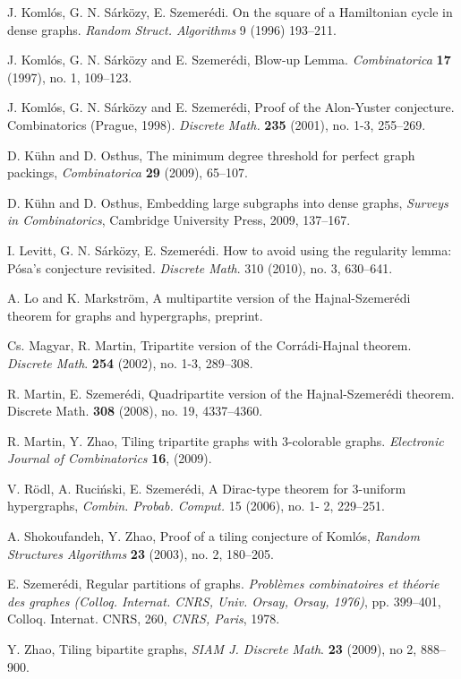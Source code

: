 \documentclass[reqno]{amsart}
\theoremstyle{plain}
\begin{document}
\begin{thebibliography}{99}
J. Koml\'os, G. N. S\'ark\"ozy, E. Szemer\'edi. On the square of a Hamiltonian
cycle in dense graphs. {\em Random Struct. Algorithms} 9 (1996) 193--211.

 J. Koml\'os, G. N. S\'ark\"ozy and E.
Szemer\'edi, Blow-up Lemma. {\em Combinatorica} {\bf 17} (1997),
no. 1, 109--123.

J. Koml\'os, G. N. S\'ark\"ozy and E. Szemer\'edi, Proof of the
Alon-Yuster conjecture. Combinatorics (Prague, 1998). {\em
Discrete Math.} {\bf 235} (2001), no. 1-3, 255--269.

D. K\"{u}hn and D. Osthus, The minimum degree threshold for perfect
graph packings, {\em Combinatorica} \textbf{29} (2009), 65--107.

D. K\"{u}hn and D. Osthus, Embedding large subgraphs into dense
graphs, {\em Surveys in Combinatorics}, Cambridge University Press, 2009, 137--167.

I. Levitt, G. N. S\'ark\"ozy, E. Szemer\'edi. How to avoid using the regularity
lemma: P\'osa's conjecture revisited. {\em Discrete Math}. 310 (2010), no. 3,
630--641.

A. Lo and K. Markstr\"{o}m, A multipartite version of the Hajnal-Szemer\'edi theorem for graphs and hypergraphs, preprint.

 Cs. Magyar, R. Martin, Tripartite version of the
Corr\'adi-Hajnal theorem. {\em Discrete Math}. \textbf{254} (2002), no.
1-3, 289--308.

 R. Martin, E. Szemer\'edi, Quadripartite version of
the Hajnal-Szemer\'edi theorem. Discrete Math. \textbf{308} (2008),
no. 19, 4337--4360.

 R. Martin, Y. Zhao, Tiling tripartite graphs with $3$-colorable graphs. {\em Electronic Journal of Combinatorics} \textbf{16}, (2009).

V. R\"odl, A. Ruci\'nski, E. Szemer\'edi, A Dirac-type theorem for 3-uniform
hypergraphs, {\em Combin. Probab. Comput.} 15 (2006), no. 1- 2, 229--251.

 A. Shokoufandeh, Y. Zhao,  Proof of a tiling
conjecture of Koml\'os, {\em Random Structures Algorithms} {\bf
23} (2003), no. 2, 180--205.

 E. Szemer\'edi, Regular partitions of graphs. {\em
Probl\`emes combinatoires et th\'eorie des graphes (Colloq.
Internat. CNRS, Univ. Orsay, Orsay, 1976)}, pp. 399--401, Colloq.
Internat. CNRS, 260, {\em CNRS, Paris}, 1978.

 Y. Zhao, Tiling bipartite graphs, {\em SIAM J. Discrete
Math}. \textbf{23} (2009), no 2, 888--900.
\end{thebibliography}
\end{document}
